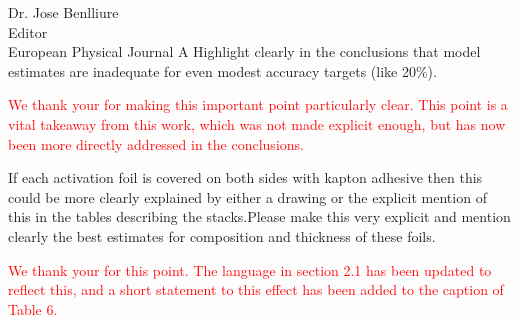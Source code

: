 \documentclass{letter} %
\newcommand{\colornote}[1]{\textcolor{red}{#1}}
\begin{document}
\begin{letter}{Dr. Jose Benlliure \\
Editor \\
European Physical Journal A}
Highlight clearly in the conclusions that model estimates are inadequate for even modest accuracy targets (like 20\%).

\colornote{We thank your for making this important point particularly clear. This point is a vital takeaway from this work, which was not made explicit enough, but has now been more directly addressed in the conclusions.}

If each activation foil is covered on both sides with kapton adhesive then this could be more clearly explained by either a drawing or the explicit mention of this in the tables describing the stacks.Please make this very explicit and mention clearly the best estimates for composition and thickness of these foils.

\colornote{We thank your for this point.  The language in section 2.1 has been updated to reflect this, and a short statement to this effect has been added to the caption of Table 6.}

 

 

\end{letter}
 
\end{document}
